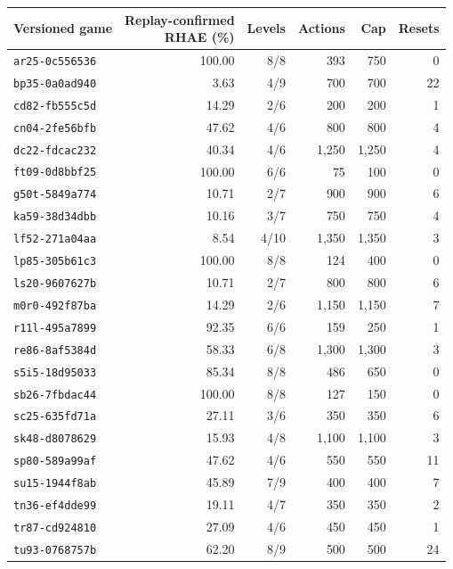 \begin{table}[H]
\centering\small
\setlength{\tabcolsep}{4pt}
\begin{tabular*}{\linewidth}{@{\extracolsep{\fill}}lrrrrr@{}}\toprule
Versioned game & \shortstack{Replay-confirmed\\RHAE (\%)} & Levels & Actions & Cap & Resets\\\midrule
\texttt{ar25-0c556536} & 100.00 & 8/8 & 393 & 750 & 0\\
\texttt{bp35-0a0ad940} & 3.63 & 4/9 & 700 & 700 & 22\\
\texttt{cd82-fb555c5d} & 14.29 & 2/6 & 200 & 200 & 1\\
\texttt{cn04-2fe56bfb} & 47.62 & 4/6 & 800 & 800 & 4\\
\texttt{dc22-fdcac232} & 40.34 & 4/6 & 1,250 & 1,250 & 4\\
\texttt{ft09-0d8bbf25} & 100.00 & 6/6 & 75 & 100 & 0\\
\texttt{g50t-5849a774} & 10.71 & 2/7 & 900 & 900 & 6\\
\texttt{ka59-38d34dbb} & 10.16 & 3/7 & 750 & 750 & 4\\
\texttt{lf52-271a04aa} & 8.54 & 4/10 & 1,350 & 1,350 & 3\\
\texttt{lp85-305b61c3} & 100.00 & 8/8 & 124 & 400 & 0\\
\texttt{ls20-9607627b} & 10.71 & 2/7 & 800 & 800 & 6\\
\texttt{m0r0-492f87ba} & 14.29 & 2/6 & 1,150 & 1,150 & 7\\
\texttt{r11l-495a7899} & 92.35 & 6/6 & 159 & 250 & 1\\
\texttt{re86-8af5384d} & 58.33 & 6/8 & 1,300 & 1,300 & 3\\
\texttt{s5i5-18d95033} & 85.34 & 8/8 & 486 & 650 & 0\\
\texttt{sb26-7fbdac44} & 100.00 & 8/8 & 127 & 150 & 0\\
\texttt{sc25-635fd71a} & 27.11 & 3/6 & 350 & 350 & 6\\
\texttt{sk48-d8078629} & 15.93 & 4/8 & 1,100 & 1,100 & 3\\
\texttt{sp80-589a99af} & 47.62 & 4/6 & 550 & 550 & 11\\
\texttt{su15-1944f8ab} & 45.89 & 7/9 & 400 & 400 & 7\\
\texttt{tn36-ef4dde99} & 19.11 & 4/7 & 350 & 350 & 2\\
\texttt{tr87-cd924810} & 27.09 & 4/6 & 450 & 450 & 1\\
\texttt{tu93-0768757b} & 62.20 & 8/9 & 500 & 500 & 24\\

\end{tabular*}
\end{table}
